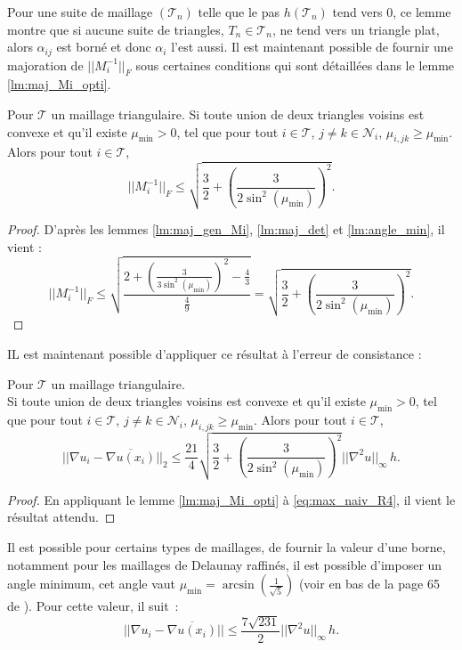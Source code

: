 \documentclass[12pt,a4paper]{article}
\begin{document}
	Pour une suite de maillage $(\mathcal T_n)$ telle que le pas $h(\mathcal T_n)$ tend vers 0, ce lemme montre que si aucune suite de triangles, $T_n \in \mathcal T_n$, ne tend vers un triangle plat, alors $\alpha_{ij}$ est borné et donc $\alpha_i$ l'est aussi. Il est maintenant possible de fournir une majoration de $|\!|M_i^{-1}|\!|_F$ sous certaines conditions qui sont détaillées dans le lemme \ref{lm:maj_Mi_opti}.
	
	\begin{lm}\label{lm:maj_Mi_opti}
		Pour $\mathcal T$ un maillage triangulaire.	Si toute union de deux triangles voisins est convexe et qu'il existe $\mu_{\min} > 0$, tel que pour tout $i \in \mathcal T$, $j \not = k \in \mathcal N_i$, $\mu_{i,jk} \geq \mu_{\min}$. Alors pour tout $i \in \mathcal T$,
		\begin{equation}
			|\!|M_i^{-1}|\!|_F \leq \sqrt{\frac32+\left(\frac{3}{2\sin^2(\mu_{\min})}\right)^2}.
		\end{equation}
	\end{lm}
	\begin{proof}
		D'après les lemmes \ref{lm:maj_gen_Mi}, \ref{lm:maj_det} et \ref{lm:angle_min}, il vient :
		\[
			|\!|M_i^{-1}|\!|_F \leq \sqrt{\dfrac{2+\left(\frac{3}{3\sin^2(\mu_{\min})}\right)^2 - \frac43}{\frac49}} = \sqrt{\frac32+\left(\frac{3}{2\sin^2(\mu_{\min})}\right)^2}.
		\]
	\end{proof}
	
	IL est maintenant possible d'appliquer ce résultat à l'erreur de consistance :
	
	\begin{thm}\label{thm:maj_erreur}
		Pour $\mathcal T$ un maillage triangulaire.\\
		Si toute union de deux triangles voisins est convexe et qu'il existe $\mu_{\min} > 0$, tel que pour tout $i \in \mathcal T$, $j \not = k \in \mathcal N_i$, $\mu_{i,jk} \geq \mu_{\min}$. Alors pour tout $i \in \mathcal T$,
		\begin{equation}
			|\!|\nabla u_i - \overline{\nabla u(x_i)}|\!|_2 \leq \frac{21}4\sqrt{\frac32+\left(\frac{3}{2\sin^2(\mu_{\min})}\right)^2}|\!|\nabla^2 u|\!|_\infty\, h.
		\end{equation}
	\end{thm}
	\begin{proof}
		En appliquant le lemme \ref{lm:maj_Mi_opti} à \eqref{eq:max_naiv_R4}, il vient le résultat attendu.
	\end{proof}
	
	Il est possible pour certains types de maillages, de fournir la valeur d'une borne, notamment pour les maillages de Delaunay raffinés, il est possible d'imposer un angle minimum, cet angle vaut $\mu_{\min} = \arcsin\left(\frac1{\sqrt{5}}\right)$ (voir en bas de la page 65 de \cite{mesh}). Pour cette valeur, il suit :	
	\[
		|\!|\nabla u_i - \overline{\nabla u(x_i)}|\!| \leq \dfrac{7\sqrt{231}}2 |\!|\nabla^2 u|\!|_\infty\, h.
	\]	
	
\end{document}

